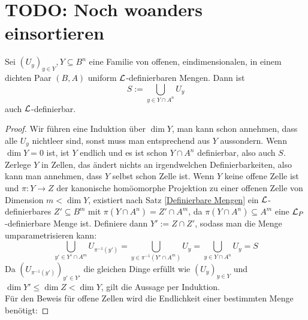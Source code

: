 \section{TODO: Noch woanders einsortieren}
\begin{lemma}
	Sei $(U_y)_{y\in Y}, Y\subseteq B^n$ eine Familie von offenen, eindimensionalen, in einem dichten Paar $(B,A)$ uniform $\mathcal{L}$-definierbaren Mengen. Dann ist $$S:=\bigcup\limits_{y\in Y\cap A^n}U_y$$ auch $\mathcal{L}$-definierbar.
\end{lemma}
\begin{proof}
	Wir führen eine Induktion über $\dim Y$, man kann schon annehmen, dass alle $U_y$ nichtleer sind, sonst muss man entsprechend aus $Y$ aussondern. Wenn $\dim Y=0$ ist, ist $Y$ endlich und es ist schon $Y\cap A^n$ definierbar, also auch $S$.\\
	Zerlege $Y$ in Zellen, das ändert nichts an irgendwelchen Definierbarkeiten, also kann man annehmen, dass $Y$ selbst schon Zelle ist. Wenn $Y$ keine offene Zelle ist und $\pi:Y\rightarrow Z$ der kanonische homöomorphe Projektion zu einer offenen Zelle von Dimension $m<\dim Y$, existiert nach Satz \ref{Definierbare Mengen} ein $\mathcal{L}$-definierbares $Z'\subseteq B^m$ mit $\pi(Y\cap A^n)=Z'\cap A^m$, da $\pi(Y\cap A^n)\subseteq A^m$ eine $\mathcal{L}_P$-definierbare Menge ist. Definiere dann $Y':=Z\cap Z'$, sodass man die Menge umparametrisieren kann:
	$$\bigcup\limits_{y'\in Y'\cap A^m}U_{\pi^{-1}(y')}=\bigcup\limits_{y\in\pi^{-1}(Y'\cap A^m)}U_y=\bigcup\limits_{y\in Y\cap A^n}U_y=S$$
	Da $(U_{\pi^{-1}(y')})_{y'\in Y'}$ die gleichen Dinge erfüllt wie $(U_y)_{y\in Y}$ und $\dim Y'\leq\dim Z<\dim Y$, gilt die Aussage per Induktion.\\
	Für den Beweis für offene Zellen wird die Endlichkeit einer bestimmten Menge benötigt:
	

\end{proof}
